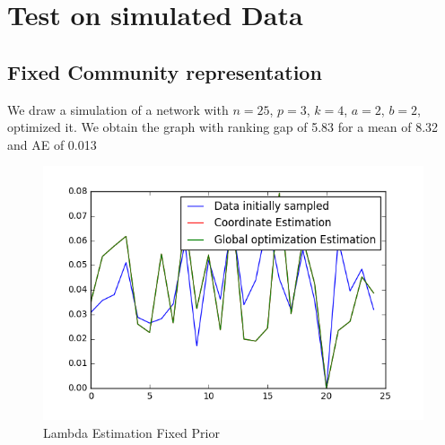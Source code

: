 \documentclass[12pt]{ociamthesis}  %
\begin{document}
	\chapter{Test on simulated Data}
	
	\section{Fixed Community representation}
	
	We draw a simulation of a network with $n = 25$, $ p = 3$, $k = 4$, $a = 2$, $b = 2$, optimized it. We obtain the graph with ranking gap of 5.83 for a mean of 8.32 and AE of 0.013
	\begin{figure}[H]
		\centering
		\includegraphics[width=\textwidth,height=\textheight,keepaspectratio]{LambdaEstimationFixedPrior}
		\caption{Lambda Estimation Fixed Prior}
		\label{label-image9}
	\end{figure}
\end{document}
